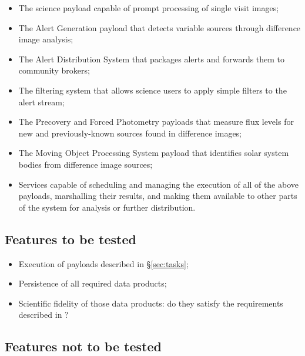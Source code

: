 \documentclass[DM,lsstdraft,STS,toc]{lsstdoc}
\begin{document}
\begin{itemize}

  \item{The science payload capable of prompt processing of single visit
	  images;}

  \item{The Alert Generation payload that detects variable sources through
	  difference image analysis;}

  \item{The Alert Distribution System that packages alerts and forwards
	  them to community brokers;}

  \item{The filtering system that allows science users to apply simple
	  filters to the alert stream;}


  \item{The Precovery and Forced Photometry payloads that measure flux
	  levels for new and previously-known sources found in difference
	  images;}

  \item{The Moving Object Processing System payload that identifies solar
	  system bodies from difference image sources;}

  \item{Services capable of scheduling and managing the execution of all of
  the above payloads, marshalling their results, and making them available to
  other parts of the system for analysis or further distribution.}

\end{itemize}

\subsection{Features to be tested}
\label{sec:feat2test}

\begin{itemize}

  \item{Execution of payloads described in \S\ref{sec:tasks};}
  \item{Persistence of all required data products;}
  \item{Scientific fidelity of those data products: do they satisfy the
  requirements described in ?}

\end{itemize}

\subsection{Features not to be tested}
\label{sec:featnot2test}
\end{document}
